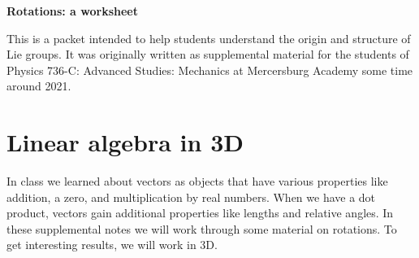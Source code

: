 %


\def\red#1{{\color{red}#1}}
\def\blue#1{{\color{blue}#1}}
\def\green#1{{\color{green}#1}}

\usepackage{placeins}
\usepackage{mathrsfs}

\def\gap{38mm}

\usepackage{amsthm} %
\theoremstyle{definition}
\newtheorem{definition}{Definition}
\theoremstyle{plain}
\newtheorem{proposition}{Proposition}
\newtheorem{lemma}{Lemma}
\newtheorem{theorem}{Theorem}
\newtheorem{corollary}{Corollary}
\newtheorem{conjecture}{Conjecture}
\newtheorem{example}{Example}
\newtheorem{result}{Result}
\newtheorem{claim}{Claim}
\newtheorem*{result*}{Result}
\newtheorem{exercise}{Exercise}
\newtheorem{problem}{Problem}




{\center
{\color{violet}\fontsize{28pt}{34pt}\bf\sffamily 
Rotations: a worksheet
\\[.5in]
}

}
{\abstract
This is a packet intended to help students understand the origin and structure of Lie groups. It was originally written as supplemental material for the students of Physics 736-C: Advanced Studies: Mechanics at Mercersburg Academy some time around 2021.
}






\section{Linear algebra in 3D}
In class we learned about vectors as objects that have various properties like addition, a zero, and multiplication by real numbers. 
When we have a dot product, vectors gain additional properties like lengths and relative angles. 
In these supplemental notes we will work through some material on rotations. 
To get interesting results, we will work in 3D. 

